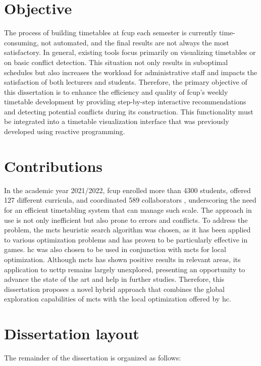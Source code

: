 \section{Objective}

The process of building timetables at \ac{fcup} each semester is currently time-consuming, not automated, and the final results are not always the most satisfactory. In general, existing tools focus primarily on visualizing timetables or on basic conflict detection. This situation not only results in suboptimal schedules but also increases the workload for administrative staff and impacts the satisfaction of both lecturers and students. Therefore, the primary objective of this dissertation is to enhance the efficiency and quality of \ac{fcup}'s weekly timetable development by providing step-by-step interactive recommendations and detecting potential conflicts during its construction. This functionality must be integrated into a timetable visualization interface that was previously developed using reactive programming.

\section{Contributions}

In the academic year 2021/2022, \ac{fcup} enrolled more than 4300 students, offered 127 different curricula, and coordinated 589 collaborators \cite{fcup_em_numeros}, underscoring the need for an efficient timetabling system that can manage such scale. The approach in use is not only inefficient but also prone to errors and conflicts. To address the problem, the \ac{mcts} heuristic search algorithm was chosen, as it has been applied to various optimization problems and has proven to be particularly effective in games. \ac{hc} was also chosen to be used in conjunction with \ac{mcts} for local optimization. Although \ac{mcts} has shown positive results in relevant areas, its application to \ac{ucttp} remains largely unexplored, presenting an opportunity to advance the state of the art and help in further studies. Therefore, this dissertation proposes a novel hybrid approach that combines the global exploration capabilities of \ac{mcts} with the local optimization offered by \ac{hc}.

\section{Dissertation layout}

The remainder of the dissertation is organized as follows:


